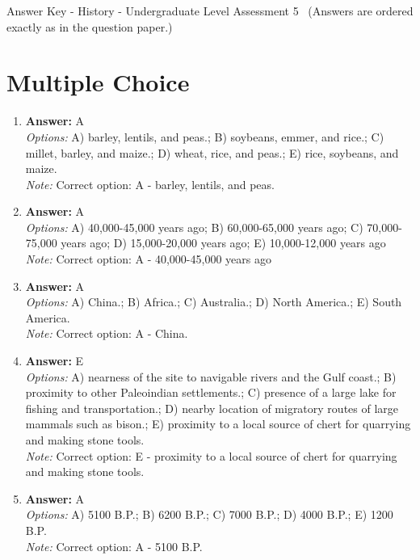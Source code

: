 \documentclass[12pt]{article}
\begin{document}
\begin{center}
Answer Key - History - Undergraduate Level Assessment 5 \
\small (Answers are ordered exactly as in the question paper.)
\end{center}

\section*{Multiple Choice}
\begin{enumerate}[label=\arabic*.]
\item \textbf{Answer:} A
\\ \textit{Options:} A) barley, lentils, and peas.; B) soybeans, emmer, and rice.; C) millet, barley, and maize.; D) wheat, rice, and peas.; E) rice, soybeans, and maize.
\\ \textit{Note:} Correct option: A - barley, lentils, and peas.
\item \textbf{Answer:} A
\\ \textit{Options:} A) 40,000-45,000 years ago; B) 60,000-65,000 years ago; C) 70,000-75,000 years ago; D) 15,000-20,000 years ago; E) 10,000-12,000 years ago
\\ \textit{Note:} Correct option: A - 40,000-45,000 years ago
\item \textbf{Answer:} A
\\ \textit{Options:} A) China.; B) Africa.; C) Australia.; D) North America.; E) South America.
\\ \textit{Note:} Correct option: A - China.
\item \textbf{Answer:} E
\\ \textit{Options:} A) nearness of the site to navigable rivers and the Gulf coast.; B) proximity to other Paleoindian settlements.; C) presence of a large lake for fishing and transportation.; D) nearby location of migratory routes of large mammals such as bison.; E) proximity to a local source of chert for quarrying and making stone tools.
\\ \textit{Note:} Correct option: E - proximity to a local source of chert for quarrying and making stone tools.
\item \textbf{Answer:} A
\\ \textit{Options:} A) 5100 B.P.; B) 6200 B.P.; C) 7000 B.P.; D) 4000 B.P.; E) 1200 B.P.
\\ \textit{Note:} Correct option: A - 5100 B.P.
\end{enumerate}
\end{document}

